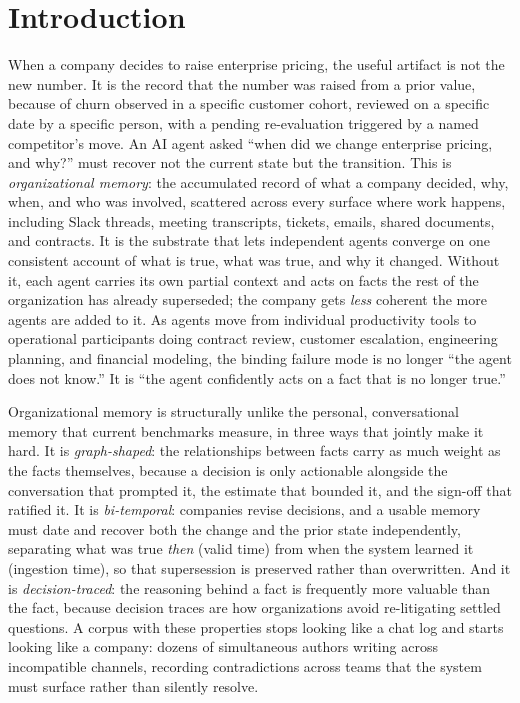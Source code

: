 \section{Introduction}
\label{sec:intro}

When a company decides to raise enterprise pricing, the useful artifact is not the
new number. It is the record that the number was raised from a prior value, because
of churn observed in a specific customer cohort, reviewed on a specific date by a
specific person, with a pending re-evaluation triggered by a named competitor's
move. An AI agent asked ``when did we change enterprise pricing, and why?'' must
recover not the current state but the transition. This is \emph{organizational
memory}: the accumulated record of what a company
decided, why, when, and who was involved, scattered across every surface where work
happens, including Slack threads, meeting transcripts, tickets, emails, shared
documents, and contracts. It is the substrate that lets independent agents converge
on one consistent account of what is true, what was true, and why it changed.
Without it, each agent carries its own partial context and acts on facts the rest of
the organization has already superseded; the company gets \emph{less} coherent the
more agents are added to it. As agents move from individual productivity tools to
operational participants doing contract review, customer escalation, engineering
planning, and financial modeling, the binding failure mode is no longer ``the agent
does not know.'' It is ``the agent confidently acts on a fact that is no longer
true.''

Organizational memory is structurally unlike the personal, conversational memory
that current benchmarks measure, in three ways that jointly make it hard. It is
\emph{graph-shaped}: the relationships between facts carry as much weight as the
facts themselves, because a decision is only actionable alongside the conversation
that prompted it, the estimate that bounded it, and the sign-off that ratified it.
It is \emph{bi-temporal}: companies revise decisions, and a usable memory must date
and recover both the change and the prior state independently, separating what was
true \emph{then} (valid time) from when the system learned it (ingestion time), so
that supersession is preserved rather than overwritten. And it is
\emph{decision-traced}: the reasoning behind a fact is frequently more valuable than
the fact, because decision traces are how organizations avoid re-litigating settled
questions. A corpus with these properties stops looking like a chat log and starts
looking like a company: dozens of simultaneous authors writing across incompatible
channels, recording contradictions across teams that the system must surface rather
than silently resolve.


